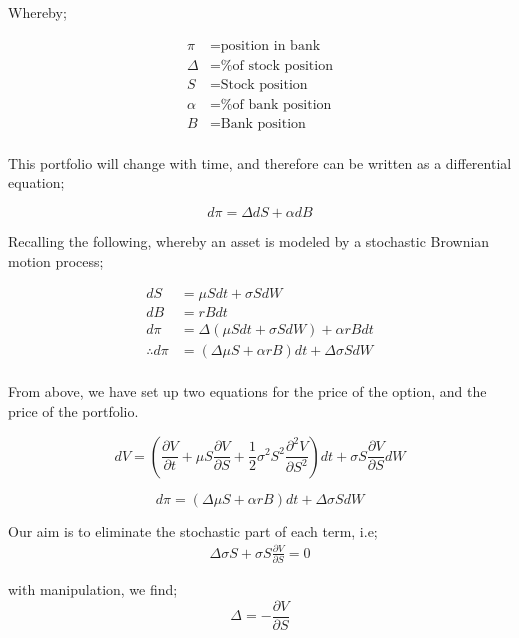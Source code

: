 \documentclass[12pt]{article}
\begin{document}
Whereby;

\begin{align*}
\pi &= \text{position in bank} \\
\Delta &= \text{\% of stock position} \\
S &= \text{Stock position} \\
\alpha &= \text{\% of bank position} \\
B &= \text{Bank position} \\
\end{align*}

This portfolio will change with time, and therefore can be written as a differential equation;

\begin{equation}
d\pi = \Delta dS + \alpha dB
\end{equation}

Recalling the following, whereby an asset is modeled by a stochastic Brownian motion process;

\begin{align*}
dS &= \mu Sdt + \sigma S dW \\
dB &= rBdt \\
d\pi &= \Delta (\mu Sdt + \sigma SdW) + \alpha rBdt \\
\therefore d \pi &= (\Delta \mu S + \alpha rB)dt + \Delta \sigma SdW \\
\end{align*}

From above, we have set up two equations for the price of the option, and the price of the portfolio.

\begin{equation}
dV = \left(\frac{\partial V}{\partial t} + \mu S \frac{\partial V}{\partial S} + \frac {1}{2}\sigma ^2 S^2 \frac{\partial ^2 V}{\partial S^2}\right)dt + \sigma S \frac{\partial V}{\partial S}dW
\end{equation}

\begin{equation}
d \pi = (\Delta \mu S + \alpha rB)dt + \Delta \sigma SdW
\end{equation}

Our aim is to eliminate the stochastic part of each term, i.e;
\begin{align*}
\Delta \sigma S + \sigma S \frac{\partial V}{\partial S} = 0
\end{align*}

with manipulation, we find;
\begin{equation}
\Delta = -\frac{\partial V}{\partial S}
\end{equation}
\end{document}
